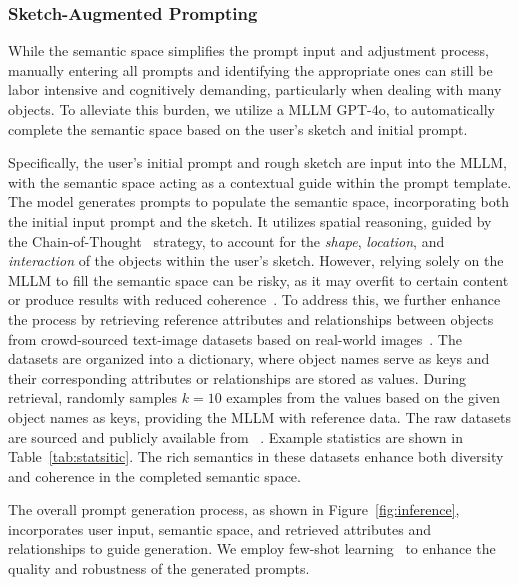 \subsubsection{Sketch-Augmented Prompting}
While the semantic space simplifies the prompt input and adjustment process, manually entering all prompts and identifying the appropriate ones can still be labor intensive and cognitively demanding, particularly when dealing with many objects. 
To alleviate this burden, we utilize a MLLM GPT-4o, to automatically complete the semantic space based on the user's sketch and initial prompt.

Specifically, the user’s initial prompt and rough sketch are input into the MLLM, with the semantic space acting as a contextual guide within the prompt template. The model generates prompts to populate the semantic space, incorporating both the initial input prompt and the sketch. It utilizes spatial reasoning, guided by the Chain-of-Thought~\cite{wei2022chain} strategy, to account for the \textit{shape}, \textit{location}, and \textit{interaction} of the objects within the user's sketch.
However, relying solely on the MLLM to fill the semantic space can be risky, as it may overfit to certain content or produce results with reduced coherence~\cite{cao2023beautifulprompt}. 
To address this, we further enhance the process by retrieving reference attributes and relationships between objects from crowd-sourced text-image datasets based on real-world images~\cite{pham2021learning,krishna2017visual}. 
The datasets are organized into a dictionary, where object names serve as keys and their corresponding attributes or relationships are stored as values. 
During retrieval, \tool randomly samples $k=10$ examples from the values based on the given object names as keys, providing the MLLM with reference data. 
The raw datasets are sourced and publicly available from ~\cite{pham2021learning,krishna2017visual}.
Example statistics are shown in Table~\ref{tab:statsitic}. 
The rich semantics in these datasets enhance both diversity and coherence in the completed semantic space.

The overall prompt generation process, as shown in Figure~\ref{fig:inference}, incorporates user input, semantic space, and retrieved attributes and relationships to guide generation. 
We employ few-shot learning~\cite{wang2023large} to enhance the quality and robustness of the generated prompts.


